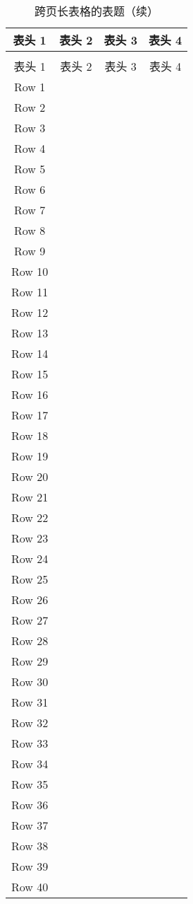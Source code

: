 \begin{longtable}{cccc}
    \caption{跨页长表格的表题} \\
    \toprule
    表头 1 & 表头 2 & 表头 3 & 表头 4 \\
    \midrule
  \endfirsthead
    \caption[]{跨页长表格的表题（续）} \\
    \toprule
    表头 1 & 表头 2 & 表头 3 & 表头 4 \\
    \midrule
  \endhead
    \bottomrule
  \endfoot
  Row 1  & & & \\
  Row 2  & & & \\
  Row 3  & & & \\
  Row 4  & & & \\
  Row 5  & & & \\
  Row 6  & & & \\
  Row 7  & & & \\
  Row 8  & & & \\
  Row 9  & & & \\
  Row 10 & & & \\
  Row 11 & & & \\
  Row 12 & & & \\
  Row 13 & & & \\
  Row 14 & & & \\
  Row 15 & & & \\
  Row 16 & & & \\
  Row 17 & & & \\
  Row 18 & & & \\
  Row 19 & & & \\
  Row 20 & & & \\
  Row 21 & & & \\
  Row 22 & & & \\
  Row 23 & & & \\
  Row 24 & & & \\
  Row 25 & & & \\
  Row 26 & & & \\
  Row 27 & & & \\
  Row 28 & & & \\
  Row 29 & & & \\
  Row 30 & & & \\
  Row 31 & & & \\
  Row 32 & & & \\
  Row 33 & & & \\
  Row 34 & & & \\
  Row 35 & & & \\
  Row 36 & & & \\
  Row 37 & & & \\
  Row 38 & & & \\
  Row 39 & & & \\
  Row 40 & & & \\
\end{longtable}




